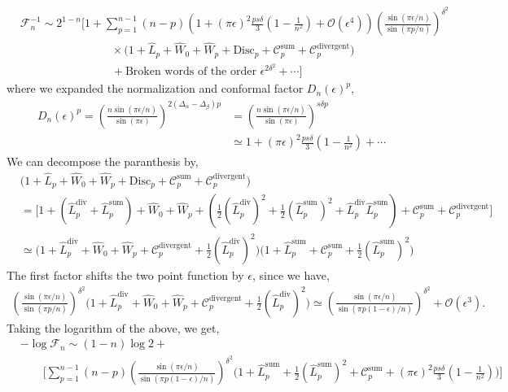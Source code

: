 \documentclass[11pt]{article}
\newcommand{\ep}{\epsilon}
\newcommand{\mO}{\mathcal{O}}
\newcommand{\nn}{\nonumber}
\newcommand{\lb}{\left(}
\newcommand{\rb}{\right)}
\begin{document}
\begin{align}
       & \mathcal{F}_n^{-1} \sim 2^{1-n} \Bigg[1 + \sum_{p=1}^{n-1}(n-p)\lb  1+  (\pi \ep)^2\frac{ps\delta}{3}\lb1 - \frac{1}{n^2}\rb  + \mO(\ep^4)\rb \lb\frac{\sin(\pi \ep/n)}{\sin (\pi p/n)}\rb^{\delta^2} \nn \\ &\qquad \qquad \qquad \qquad  \times \Big( 1 + \hat{L}_p + \hat{W}_0 + \hat{W}_p + \text{Disc}_p + \mathcal{C}_p^{\text{sum}} + \mathcal{C}_p^{\text{divergent}}\Big) \nn\\&\qquad\qquad \qquad \qquad 
        + \text{Broken words of the order }\ep^{2\delta^2} + \cdots \Bigg] 
    \end{align}
where we expanded the normalization and conformal factor $D_n(\ep)^p$,
\begin{align}
    D_n(\ep)^p = \lb\frac{n\sin(\pi \ep/n)}{\sin(\pi \ep)}\rb^{2(\Delta_\alpha - \Delta_\beta)p} &= \lb\frac{n\sin(\pi \ep/n)}{\sin(\pi \ep)}\rb^{s\delta p} \\
    &\simeq 1+  (\pi \ep)^2\frac{ps\delta}{3}\lb1 - \frac{1}{n^2}\rb + \cdots
\end{align}
We can decompose the paranthesis by,
\begin{align}
    &\Big( 1 + \hat{L}_p + \hat{W}_0 + \hat{W}_p + \text{Disc}_p + \mathcal{C}_p^{\text{sum}} + \mathcal{C}_p^{\text{divergent}} \Big) \\
    &= \Bigg[ 1 + \lb \hat{L}_p^{\text{div}} + \hat{L}_p^{\text{sum}} \rb + \hat{W}_0 + \hat{W}_p + \lb  \frac{1}{2}\lb\hat{L}_p^{\text{div}}\rb^2+   \frac{1}{2}\lb\hat{L}_p^{\text{sum}}\rb^2 + \hat{L}_p^{\text{div}}\hat{L}_p^{\text{sum}}\rb  + \mathcal{C}_p^{\text{sum}} + \mathcal{C}_p^{\text{divergent}} \Bigg]
    \\
    & \simeq \Bigg(1 + \hat{L}_p^{\text{div}} + \hat{W}_0 + \hat{W}_p +\mathcal{C}_p^{\text{divergent}} +  \frac{1}{2}\lb\hat{L}_p^{\text{div}}\rb^2\Bigg) \Bigg( 1+ \hat{L}_p^{\text{sum}} + \mathcal{C}_p^{\text{sum} } + \frac{1}{2}\lb \hat{L}_p^{\text{sum}}\rb^2\Bigg)
\end{align}
The first factor shifts the two point function by $\ep$, since we have,
\begin{align}
    \lb\frac{\sin(\pi \ep/n)}{\sin (\pi p/n)}\rb^{\delta^2} \Bigg(1 + \hat{L}_p^{\text{div}} + \hat{W}_0 + \hat{W}_p +\mathcal{C}_p^{\text{divergent}} + \frac{1}{2}\lb \hat{L}_p^{\text{div}}\rb^2\Bigg) \simeq  \lb\frac{\sin(\pi \ep/n)}{\sin (\pi p(1-\ep)/n)}\rb^{\delta^2} + \mO(\ep^3).
\end{align}
Taking the logarithm of the above, we get,
\begin{align}
        &-\log \mathcal{F}_n\sim (1-n)\log 2 + \nn\\ &\qquad \Bigg[ \sum_{p=1}^{n-1}(n-p) \lb\frac{\sin(\pi \ep/n)}{\sin (\pi p(1-\ep)/n)}\rb^{\delta^2} \Big( 1 + \hat{L}_p^{\text{sum}}   + \frac{1}{2}\lb \hat{L}_p^{\text{sum}}\rb ^2 + \mathcal{C}_p^{\text{sum}} + (\pi \ep)^2\frac{ps\delta}{3}\lb1 - \frac{1}{n^2}\rb\Big)   \Bigg]
\end{align}
\end{document}
